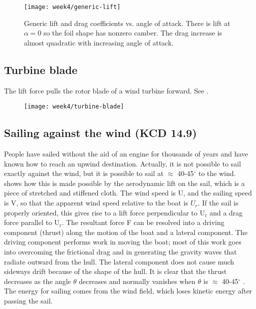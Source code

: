 \begin{figure}[!h]
    \centering
    \texttt{[image: week4/generic-lift]}\\
    \caption{Generic lift and drag coefficients vs. angle of attack. There is lift at $\alpha=0$ so the foil shape has nonzero camber. The drag increase is almost quadratic with increasing angle of attack.}
    \label{fig:generic-lift}
\end{figure}


\subsection{Turbine blade}
The lift force pulls the rotor blade of a wind turbine forward. See .
\begin{figure}[!h]
    \centering
    \texttt{[image: week4/turbine-blade]}\\
    \caption{}
    \label{fig:turbine-blade}
\end{figure}


\subsection[Sailing against the wind]{Sailing against the wind (KCD 14.9)}
People have sailed without the aid of an engine for thousands of years and have known
how to reach an upwind destination. Actually, it is not possible to sail exactly against the
wind, but it is possible to sail at $\approx$ 40-45$^\circ$ to the wind.  shows
how this is made possible by the aerodynamic lift on the sail, which is a piece of stretched and stiffened
cloth. The wind speed is U, and the sailing speed is V, so that the apparent wind speed relative
to the boat is $U_r$. If the sail is properly oriented, this gives rise to a lift force perpendicular
to U$_\text{r}$ and a drag force parallel to U$_\text{r}$. The resultant force F can be resolved into a driving
component (thrust) along the motion of the boat and a lateral component. The driving
component performs work in moving the boat; most of this work goes into overcoming
the frictional drag and in generating the gravity waves that radiate outward from the hull.
The lateral component does not cause much sideways drift because of the shape of the
hull. It is clear that the thrust decreases as the angle $\theta$ decreases and normally vanishes
when $\theta$ is $\approx$ 40-45$^\circ$ . The energy for sailing comes from the wind field, which loses kinetic
energy after passing the sail.


